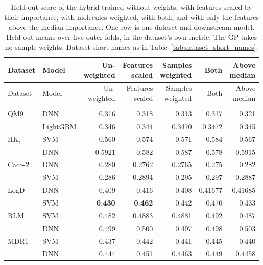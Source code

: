 \begin{longtable}{@{}llrrrrr@{}}
\caption[Importance scores used again during training.]{Held-out score of the hybrid trained without weights, with features scaled by their importance, with molecules weighted, with both, and with only the features above the median importance. One row is one dataset and downstream model. Held-out means over five outer folds, in the dataset's own metric. The GP takes no sample weights. Dataset short names as in Table~\ref{tab:dataset_short_names}.}
\label{tab:method:importance_training}\\
\toprule
Dataset & Model & \makecell[r]{Un-\\weighted} & \makecell[r]{Features\\scaled} & \makecell[r]{Samples\\weighted} & Both & \makecell[r]{Above\\median} \\
\midrule
\endfirsthead
\toprule
Dataset & Model & \makecell[r]{Un-\\weighted} & \makecell[r]{Features\\scaled} & \makecell[r]{Samples\\weighted} & Both & \makecell[r]{Above\\median} \\
\midrule
\endhead
\bottomrule
\endfoot
\multicolumn{7}{@{}l}{\textit{RMSE $\downarrow$}} \\*
QM9 & DNN & 0.316 & 0.318 & 0.313 & 0.317 & 0.321 \\*
 & LightGBM & 0.346 & 0.344 & 0.3470 & 0.3472 & 0.345 \\
HK$_i$ & SVM & 0.560 & 0.574 & 0.571 & 0.584 & 0.567 \\*
 & DNN & 0.5921 & 0.582 & 0.587 & 0.578 & 0.5915 \\
Caco-2 & DNN & 0.280 & 0.2762 & 0.2765 & 0.275 & 0.282 \\*
 & SVM & 0.286 & 0.2894 & 0.295 & 0.297 & 0.2887 \\
LogD & DNN & 0.409 & 0.416 & 0.408 & 0.41677 & 0.41685 \\*
 & SVM & \textbf{0.430} & \textbf{0.462} & 0.442 & 0.470 & 0.433 \\
RLM & SVM & 0.482 & 0.4883 & 0.4881 & 0.492 & 0.487 \\*
 & DNN & 0.499 & 0.500 & 0.497 & 0.498 & 0.503 \\
MDR1 & SVM & 0.437 & 0.442 & 0.441 & 0.445 & 0.440 \\*
 & DNN & 0.444 & 0.451 & 0.4463 & 0.449 & 0.4458 \\

\end{longtable}
